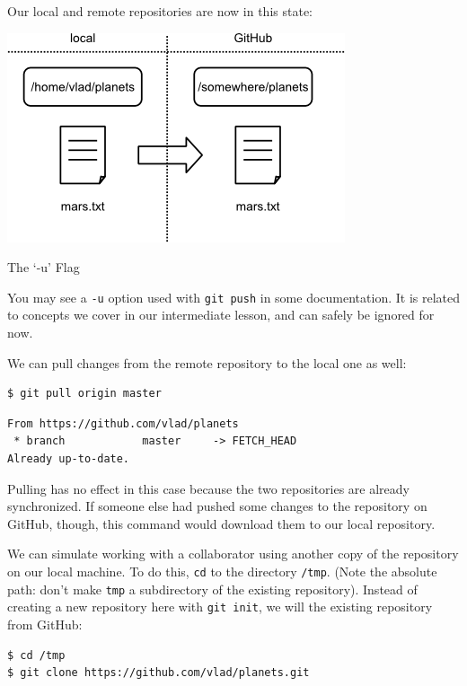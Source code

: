 \documentclass{book}
\begin{document}
Our local and remote repositories are now in this state:

\includegraphics{novice/git/img/github-repo-after-first-push.png}

\begin{swcbox}{The `-u' Flag}

You may see a \texttt{-u} option used with \texttt{git push} in some
documentation. It is related to concepts we cover in our intermediate
lesson, and can safely be ignored for now.

\end{swcbox}

We can pull changes from the remote repository to the local one as well:

\begin{verbatim}
$ git pull origin master
\end{verbatim}

\begin{verbatim}
From https://github.com/vlad/planets
 * branch            master     -> FETCH_HEAD
Already up-to-date.
\end{verbatim}

Pulling has no effect in this case because the two repositories are
already synchronized. If someone else had pushed some changes to the
repository on GitHub, though, this command would download them to our
local repository.

We can simulate working with a collaborator using another copy of the
repository on our local machine. To do this, \texttt{cd} to the
directory \texttt{/tmp}. (Note the absolute path: don't make
\texttt{tmp} a subdirectory of the existing repository). Instead of
creating a new repository here with \texttt{git init}, we will
 the existing repository from
GitHub:

\begin{verbatim}
$ cd /tmp
$ git clone https://github.com/vlad/planets.git
\end{verbatim}
\end{document}
